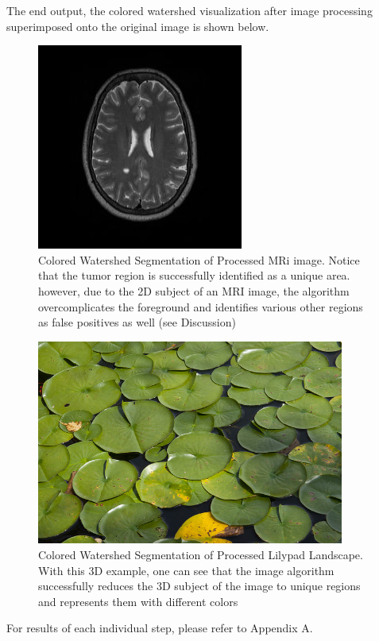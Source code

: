 \documentclass[12pt]{article}
\theoremstyle{plain}%
\theoremstyle{definition}
\theoremstyle{remark}
\begin{document}
The end output, the colored watershed visualization after image processing superimposed onto the original image is shown below.

\begin{figure}[!h]
	\centering
		\includegraphics{original.jpg}
	\caption{Colored Watershed Segmentation of Processed MRi image.  Notice that the tumor region is successfully identified as a unique area.  however, due to the 2D subject of an MRI image, the algorithm overcomplicates the foreground and identifies various other regions as false positives as well (see Discussion)}
\end{figure}

\begin{figure}[!h]
	\centering
		\includegraphics[width=0.9\textwidth]{lilypad.jpg}
	\caption{Colored Watershed Segmentation of Processed Lilypad Landscape.  With this 3D example, one can see that the image algorithm successfully reduces the 3D subject of the image to unique regions and represents them with different colors}
\end{figure}

For results of each individual step, please refer to Appendix A.
\end{document}
